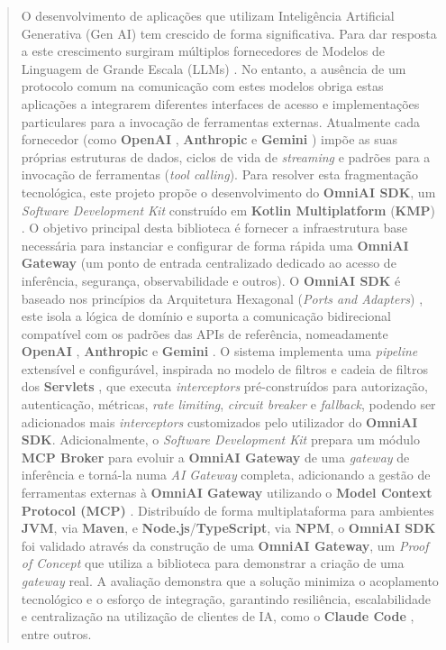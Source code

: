 \begin{abstract}
O desenvolvimento de aplicações que utilizam Inteligência Artificial Generativa (Gen AI)\cite{ibm_generative_ai} tem crescido de forma significativa. Para dar resposta a este crescimento surgiram múltiplos fornecedores de Modelos de Linguagem de Grande Escala (LLMs) \cite{ibm_llm_topics}. No entanto, a ausência de um protocolo comum na comunicação com estes modelos obriga estas aplicações a integrarem diferentes interfaces de acesso e implementações particulares para a invocação de ferramentas externas. Atualmente cada fornecedor (como \textbf{OpenAI} \cite{openai_api}, \textbf{Anthropic} \cite{anthropic_api} e \textbf{Gemini} \cite{google_gemini_api}) impõe as suas próprias estruturas de dados, ciclos de vida de \textit{streaming} e padrões para a invocação de ferramentas (\textit{tool calling})\cite{ibm_tool_calling}\cite{toolCallingCycle}. Para resolver esta fragmentação tecnológica, este projeto propõe o desenvolvimento do \textbf{OmniAI SDK}, um \textit{Software Development Kit} construído em \textbf{Kotlin Multiplatform} (\textbf{KMP}) \cite{kmp_ref}. O objetivo principal desta biblioteca é fornecer a infraestrutura base necessária para instanciar e configurar de forma rápida uma \textbf{OmniAI Gateway} (um ponto de entrada centralizado dedicado ao acesso de inferência, segurança, observabilidade e outros). 
O \textbf{OmniAI SDK} é baseado nos princípios da Arquitetura Hexagonal (\textit{Ports and Adapters}) \cite{hexagonal_ports}, este isola a lógica de domínio e suporta a comunicação bidirecional compatível com os padrões das APIs de referência, nomeadamente \textbf{OpenAI} \cite{openai_api}, \textbf{Anthropic} \cite{anthropic_api} e \textbf{Gemini} \cite{google_gemini_api}. O sistema implementa uma \textit{pipeline} extensível e configurável, 
inspirada no modelo de filtros e cadeia de filtros dos \textbf{Servlets} \cite{java_servlet_filter}\cite{java_servlet_filterchain}, que executa \textit{interceptors} pré-construídos para autorização, 
autenticação, métricas, \textit{rate limiting}, \textit{circuit breaker} e \textit{fallback}, podendo ser adicionados mais \textit{interceptors} customizados pelo utilizador do \textbf{OmniAI SDK}. 
Adicionalmente, o \textit{Software Development Kit} prepara um módulo \textbf{MCP Broker} para evoluir a \textbf{OmniAI Gateway} de uma \textit{gateway} de inferência e torná-la numa \textit{AI Gateway} completa, adicionando a gestão de ferramentas externas à \textbf{OmniAI Gateway} utilizando o \textbf{Model Context Protocol (MCP)} \cite{mcp_protocol}. Distribuído de forma multiplataforma para ambientes \textbf{JVM}, 
via \textbf{Maven}, e \textbf{Node.js}/\textbf{TypeScript}, via \textbf{NPM}, o \textbf{OmniAI SDK} foi validado através da construção de uma \textbf{OmniAI Gateway}, 
um \textit{Proof of Concept} que utiliza a biblioteca para demonstrar a criação de uma \textit{gateway} real. A avaliação demonstra que a solução 
minimiza o acoplamento tecnológico e o esforço de integração, garantindo resiliência, escalabilidade e centralização na utilização de clientes de IA, como o \textbf{Claude Code} \cite{claude_code}, entre outros.
\end{abstract}

